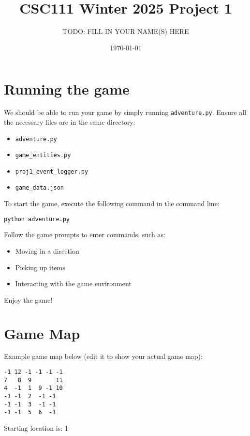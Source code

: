 \documentclass[11pt]{article}
\title{CSC111 Winter 2025 Project 1}
\author{TODO: FILL IN YOUR NAME(S) HERE}
\date{\today}
\begin{document}
\maketitle

\section*{Running the game}
We should be able to run your game by simply running \texttt{adventure.py}. 
Ensure all the necessary files are in the same directory:
\begin{itemize}
    \item \texttt{adventure.py}
    \item \texttt{game_entities.py}
    \item \texttt{proj1_event_logger.py}
    \item \texttt{game_data.json}
\end{itemize}

To start the game, execute the following command in the command line:
\begin{lstlisting}
python adventure.py
\end{lstlisting}

Follow the game prompts to enter commands, such as:
\begin{itemize}
    \item Moving in a direction
    \item Picking up items
    \item Interacting with the game environment
\end{itemize}

Enjoy the game!

\section*{Game Map}
Example game map below (edit it to show your actual game map):

\begin{verbatim}
-1 12 -1 -1 -1 -1
7   8  9       11
4  -1  1  9 -1 10
-1 -1  2  -1 -1
-1 -1  3  -1 -1
-1 -1  5  6  -1
\end{verbatim}

Starting location is: 1
\end{document}
